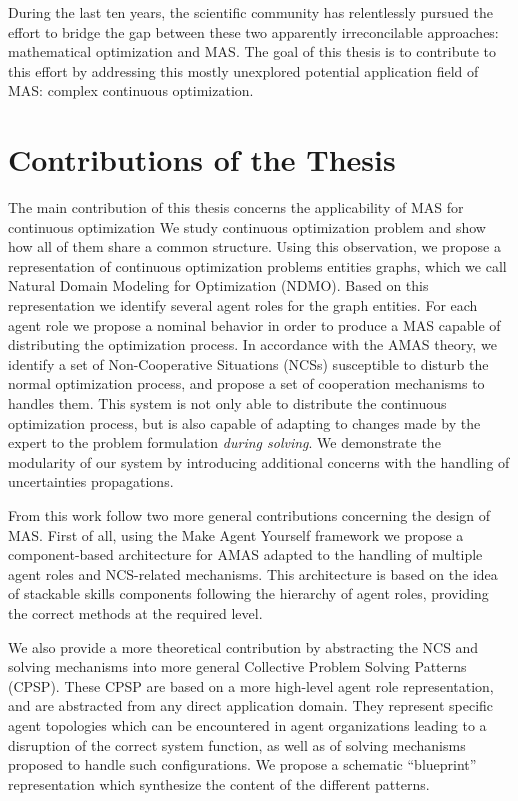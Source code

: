 During the last ten years, the scientific community has relentlessly pursued the effort to bridge the gap between these two apparently irreconcilable approaches: mathematical optimization and MAS. The goal of this thesis is to contribute to this effort by addressing this mostly unexplored potential application field of MAS: complex continuous optimization.

\section*{Contributions of the Thesis}

The main contribution of this thesis concerns the applicability of MAS for continuous optimization We study continuous optimization problem and show how all of them share a common structure. Using this observation, we propose a representation of continuous optimization problems entities graphs, which we call Natural Domain Modeling for Optimization (NDMO). Based on this representation we identify several agent roles for the graph entities. For each agent role we propose a nominal behavior in order to produce a MAS capable of distributing the optimization process. In accordance with the AMAS theory, we identify a set of Non-Cooperative Situations (NCSs) susceptible to disturb the normal optimization process, and propose a set of cooperation mechanisms to handles them. This system is not only able to distribute the continuous optimization process, but is also capable of adapting to changes made by the expert to the problem formulation \emph{during solving}. We demonstrate the modularity of our system by introducing additional concerns with the handling of uncertainties propagations.

From this work follow two more general contributions concerning the design of MAS.  First of all, using the Make Agent Yourself framework  we propose a component-based architecture for AMAS adapted to the handling of multiple agent roles and NCS-related mechanisms. This architecture is based on the idea of stackable skills components following the hierarchy of agent roles, providing the correct methods at the required level.

We also provide a more theoretical contribution by abstracting the NCS and solving mechanisms into more general Collective Problem Solving Patterns (CPSP). These CPSP are based on a more high-level agent role representation, and are abstracted from any direct application domain. They represent specific agent topologies which can be encountered in agent organizations leading to a disruption of the correct system function, as well as of solving mechanisms proposed to handle such configurations. We propose a schematic \enquote{blueprint} representation which synthesize the content of the different patterns.

